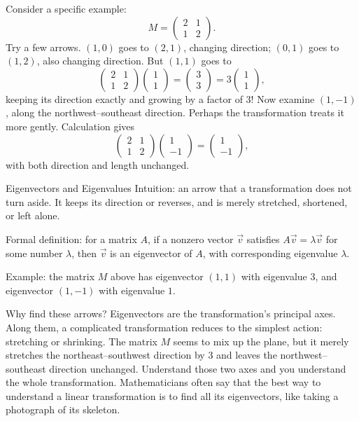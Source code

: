 Consider a specific example:
\[
M=\begin{pmatrix}2&1\\1&2\end{pmatrix}.
\]
Try a few arrows. $(1,0)$ goes to $(2,1)$, changing direction; $(0,1)$ goes to $(1,2)$, also changing direction. But $(1,1)$ goes to
\[
\begin{pmatrix}2&1\\1&2\end{pmatrix}\begin{pmatrix}1\\1\end{pmatrix}=\begin{pmatrix}3\\3\end{pmatrix}=3\begin{pmatrix}1\\1\end{pmatrix},
\]
keeping its direction exactly and growing by a factor of $3$! Now examine $(1,-1)$, along the northwest--southeast direction. Perhaps the transformation treats it more gently. Calculation gives
\[
\begin{pmatrix}2&1\\1&2\end{pmatrix}\begin{pmatrix}1\\-1\end{pmatrix}=\begin{pmatrix}1\\-1\end{pmatrix},
\]
with both direction and length unchanged.

\begin{shuyu}{Eigenvectors and Eigenvalues}
Intuition: an arrow that a transformation does not turn aside. It keeps its direction or reverses, and is merely stretched, shortened, or left alone.

Formal definition: for a matrix $A$, if a nonzero vector $\vec{v}$ satisfies $A\vec{v}=\lambda\vec{v}$ for some number $\lambda$, then $\vec{v}$ is an eigenvector of $A$, with corresponding eigenvalue $\lambda$.

Example: the matrix $M$ above has eigenvector $(1,1)$ with eigenvalue $3$, and eigenvector $(1,-1)$ with eigenvalue $1$.
\end{shuyu}

Why find these arrows? Eigenvectors are the transformation's principal axes. Along them, a complicated transformation reduces to the simplest action: stretching or shrinking. The matrix $M$ seems to mix up the plane, but it merely stretches the northeast--southwest direction by $3$ and leaves the northwest--southeast direction unchanged. Understand those two axes and you understand the whole transformation. Mathematicians often say that the best way to understand a linear transformation is to find all its eigenvectors, like taking a photograph of its skeleton.

